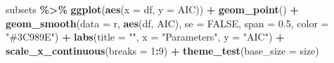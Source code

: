 \documentclass[
  english,
  man,floatsintext]{apa6}
\newenvironment{Shaded}{\begin{snugshade}}{\end{snugshade}}
\newcommand{\DataTypeTok}[1]{\textcolor[rgb]{0.13,0.29,0.53}{#1}}
\newcommand{\DecValTok}[1]{\textcolor[rgb]{0.00,0.00,0.81}{#1}}
\newcommand{\FloatTok}[1]{\textcolor[rgb]{0.00,0.00,0.81}{#1}}
\newcommand{\KeywordTok}[1]{\textcolor[rgb]{0.13,0.29,0.53}{\textbf{#1}}}
\newcommand{\NormalTok}[1]{#1}
\newcommand{\OperatorTok}[1]{\textcolor[rgb]{0.81,0.36,0.00}{\textbf{#1}}}
\newcommand{\OtherTok}[1]{\textcolor[rgb]{0.56,0.35,0.01}{#1}}
\newcommand{\StringTok}[1]{\textcolor[rgb]{0.31,0.60,0.02}{#1}}
\begin{document}
\begin{Shaded}
\begin{Highlighting}[]
\NormalTok{subsets }\OperatorTok{\%\textgreater{}\%}\StringTok{ }
\StringTok{  }\KeywordTok{ggplot}\NormalTok{(}\KeywordTok{aes}\NormalTok{(}\DataTypeTok{x =}\NormalTok{ df, }\DataTypeTok{y =}\NormalTok{ AIC)) }\OperatorTok{+}\StringTok{ }
\StringTok{  }\KeywordTok{geom\_point}\NormalTok{() }\OperatorTok{+}\StringTok{ }
\StringTok{  }\KeywordTok{geom\_smooth}\NormalTok{(}\DataTypeTok{data =}\NormalTok{ r, }\KeywordTok{aes}\NormalTok{(df, AIC), }
              \DataTypeTok{se =} \OtherTok{FALSE}\NormalTok{, }\DataTypeTok{span =} \FloatTok{0.5}\NormalTok{, }\DataTypeTok{color =} \StringTok{"\#3C989E"}\NormalTok{) }\OperatorTok{+}\StringTok{ }
\StringTok{  }\KeywordTok{labs}\NormalTok{(}\DataTypeTok{title =} \StringTok{""}\NormalTok{, }\DataTypeTok{x =} \StringTok{"Parameters"}\NormalTok{, }\DataTypeTok{y =} \StringTok{"AIC"}\NormalTok{) }\OperatorTok{+}\StringTok{ }
\StringTok{  }\KeywordTok{scale\_x\_continuous}\NormalTok{(}\DataTypeTok{breaks =} \DecValTok{1}\OperatorTok{:}\DecValTok{9}\NormalTok{) }\OperatorTok{+}\StringTok{ }
\StringTok{  }\KeywordTok{theme\_test}\NormalTok{(}\DataTypeTok{base\_size =}\NormalTok{ size) }


\end{Highlighting}
\end{Shaded}
\end{document}

